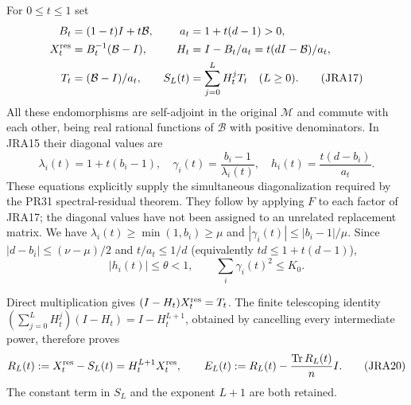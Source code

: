 \documentclass[11pt,a4paper]{article}
\newcommand{\Tr}{\operatorname{Tr}}
\begin{document}
For $0\leq t\leq1$ set
\begin{align}
 B_t&=(1-t)I+t\mathcal B,&a_t&=1+t(d-1)>0,\notag\\
 X_t^{\rm res}&=B_t^{-1}(\mathcal B-I),&
 H_t&=I-B_t/a_t=t(dI-\mathcal B)/a_t,\notag\\
 T_t&=(\mathcal B-I)/a_t,&
 S_L(t)&=\sum_{j=0}^L H_t^jT_t\quad(L\geq0).
 \tag{JRA17}
\end{align}
All these endomorphisms are self-adjoint in the original $\mathcal M$
and commute with each other, being real rational functions of
$\mathcal B$ with positive denominators. In JRA15 their diagonal values are
\begin{equation}
 \lambda_i(t)=1+t(b_i-1),\quad
 \gamma_i(t)=\frac{b_i-1}{\lambda_i(t)},\quad
 h_i(t)=\frac{t(d-b_i)}{a_t}.
 \tag{JRA18}
\end{equation}
These equations explicitly supply the simultaneous diagonalization
required by the PR31 spectral-residual theorem. They follow by applying
$F$ to each factor of JRA17; the diagonal values have not been assigned
to an unrelated replacement matrix.
We have $\lambda_i(t)\geq\min(1,b_i)\geq\mu$ and
$|\gamma_i(t)|\leq|b_i-1|/\mu$.
Since $|d-b_i|\leq(\nu-\mu)/2$ and
$t/a_t\leq1/d$ (equivalently $td\leq1+t(d-1)$),
\begin{equation}
 |h_i(t)|\leq\theta<1,\qquad
 \sum_i\gamma_i(t)^2\leq K_0.
 \tag{JRA19}
\end{equation}

Direct multiplication gives $(I-H_t)X_t^{\rm res}=T_t$. The finite
telescoping identity
$\left(\sum_{j=0}^L H_t^j\right)(I-H_t)=I-H_t^{L+1}$, obtained by
cancelling every intermediate power, therefore proves
\begin{equation}
 R_L(t):=X_t^{\rm res}-S_L(t)=H_t^{L+1}X_t^{\rm res},\qquad
 E_L(t):=R_L(t)-\frac{\Tr R_L(t)}{n}I.
 \tag{JRA20}
\end{equation}
The constant term in $S_L$ and the exponent $L+1$ are both retained.
\end{document}
